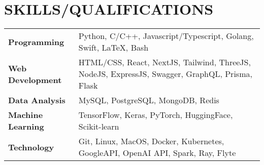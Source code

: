 \section{SKILLS/QUALIFICATIONS}

\small{
  \begin{tabularx}{\linewidth}{@{} p{3.5cm} X @{}}
    \textbf{Programming} & Python, C/C++, Javascript/Typescript, Golang, Swift, LaTeX, Bash \\
    \textbf{Web Development} & HTML/CSS, React, NextJS, Tailwind, ThreeJS, NodeJS, ExpressJS, Swagger, GraphQL, Prisma, Flask \\
    \textbf{Data Analysis} & MySQL, PostgreSQL, MongoDB, Redis \\
    \textbf{Machine Learning} & TensorFlow, Keras, PyTorch, HuggingFace, Scikit-learn \\
    \textbf{Technology} & Git, Linux, MacOS, Docker, Kubernetes, GoogleAPI, OpenAI API, Spark, Ray, Flyte \\
  \end{tabularx}
}